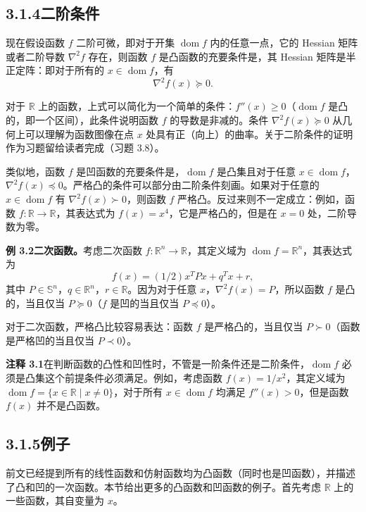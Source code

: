 \documentclass[UTF8,12pt,a4paper,fontset=fandol]{ctexart}
\DeclareMathOperator{\dom}{dom}
\begin{document}
\subsection*{3.1.4\quad 二阶条件}

现在假设函数 $f$ 二阶可微，即对于开集 $\dom f$ 内的任意一点，它的 Hessian 矩阵或者二阶导数 $\nabla^2 f$ 存在，则函数 $f$ 是凸函数的充要条件是，其 Hessian 矩阵是半正定阵：即对于所有的 $x\in\dom f$，有
\[
\nabla^2 f(x)\succeq 0.
\]

对于 $\mathbb{R}$ 上的函数，上式可以简化为一个简单的条件：$f''(x)\geq0$（$\dom f$ 是凸的，即一个区间），此条件说明函数 $f$ 的导数是非减的。条件 $\nabla^2 f(x)\succeq0$ 从几何上可以理解为函数图像在点 $x$ 处具有正（向上）的曲率。关于二阶条件的证明作为习题留给读者完成（习题 3.8）。

类似地，函数 $f$ 是凹函数的充要条件是，$\dom f$ 是凸集且对于任意 $x\in\dom f$，$\nabla^2 f(x)\preceq0$。严格凸的条件可以部分由二阶条件刻画。如果对于任意的 $x\in\dom f$ 有 $\nabla^2 f(x)\succ0$，则函数 $f$ 严格凸。反过来则不一定成立：例如，函数 $f:\mathbb{R}\to\mathbb{R}$，其表达式为 $f(x)=x^4$，它是严格凸的，但是在 $x=0$ 处，二阶导数为零。

\noindent\textbf{例 3.2\quad 二次函数。}\quad 考虑二次函数 $f:\mathbb{R}^n\to\mathbb{R}$，其定义域为 $\dom f=\mathbb{R}^n$，其表达式为
\[
f(x)=(1/2)x^TPx+q^Tx+r,
\]
其中 $P\in\mathbb{S}^n$，$q\in\mathbb{R}^n$，$r\in\mathbb{R}$。因为对于任意 $x$，$\nabla^2 f(x)=P$，所以函数 $f$ 是凸的，当且仅当 $P\succeq0$（$f$ 是凹的当且仅当 $P\preceq0$）。

对于二次函数，严格凸比较容易表达：函数 $f$ 是严格凸的，当且仅当 $P\succ0$（函数是严格凹的当且仅当 $P\prec0$）。

\noindent\textbf{注释 3.1}\quad 在判断函数的凸性和凹性时，不管是一阶条件还是二阶条件，$\dom f$ 必须是凸集这个前提条件必须满足。例如，考虑函数 $f(x)=1/x^2$，其定义域为 $\dom f=\{x\in\mathbb{R}\mid x\neq0\}$，对于所有 $x\in\dom f$ 均满足 $f''(x)>0$，但是函数 $f(x)$ 并不是凸函数。

\subsection*{3.1.5\quad 例子}

前文已经提到所有的线性函数和仿射函数均为凸函数（同时也是凹函数），并描述了凸和凹的一次函数。本节给出更多的凸函数和凹函数的例子。首先考虑 $\mathbb{R}$ 上的一些函数，其自变量为 $x$。
\end{document}
